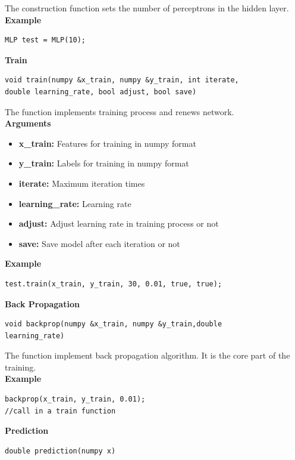 \documentclass[a4paper]{article}
\begin{document}
The construction function sets the number of perceptrons in the hidden layer.\\
\textbf{Example}
\begin{lstlisting}[language={[ANSI]C++},keywordstyle=\color{blue!70},commentstyle=\color{red!50!green!50!blue!50},frame=shadowbox, rulesepcolor=\color{red!20!green!20!blue!20}]
MLP test = MLP(10);
\end{lstlisting}
\textbf{\Large Train}
\begin{lstlisting}[language={[ANSI]C++},keywordstyle=\color{blue!70},commentstyle=\color{red!50!green!50!blue!50},frame=shadowbox, rulesepcolor=\color{red!20!green!20!blue!20}]
void train(numpy &x_train, numpy &y_train, int iterate, 
double learning_rate, bool adjust, bool save)
\end{lstlisting}

The function implements training process and renews network.\\
\textbf{Arguments}
\begin{itemize}
	\item{\textbf{x\_train:} Features for training in numpy format}
    \item{\textbf{y\_train:} Labels for training in numpy format}
    \item{\textbf{iterate:} Maximum iteration times}
    \item{\textbf{learning\_rate:} Learning rate}
    \item{\textbf{adjust:} Adjust learning rate in training process or not}
    \item{\textbf{save:} Save model after each iteration or not}
\end{itemize}
\textbf{Example}
\begin{lstlisting}[language={[ANSI]C++},keywordstyle=\color{blue!70},commentstyle=\color{red!50!green!50!blue!50},frame=shadowbox, rulesepcolor=\color{red!20!green!20!blue!20}]
test.train(x_train, y_train, 30, 0.01, true, true);
\end{lstlisting}
\textbf{\Large Back Propagation}
\begin{lstlisting}[language={[ANSI]C++},keywordstyle=\color{blue!70},commentstyle=\color{red!50!green!50!blue!50},frame=shadowbox, rulesepcolor=\color{red!20!green!20!blue!20}]
void backprop(numpy &x_train, numpy &y_train,double 
learning_rate)
\end{lstlisting}

The function implement back propagation algorithm. It is the core part of the training.\\
\textbf{Example}
\begin{lstlisting}[language={[ANSI]C++},keywordstyle=\color{blue!70},commentstyle=\color{red!50!green!50!blue!50},frame=shadowbox, rulesepcolor=\color{red!20!green!20!blue!20}]
backprop(x_train, y_train, 0.01);
//call in a train function
\end{lstlisting}
\textbf{\Large Prediction}
\begin{lstlisting}[language={[ANSI]C++},keywordstyle=\color{blue!70},commentstyle=\color{red!50!green!50!blue!50},frame=shadowbox, rulesepcolor=\color{red!20!green!20!blue!20}]
double prediction(numpy x)
\end{lstlisting}
\end{document}
